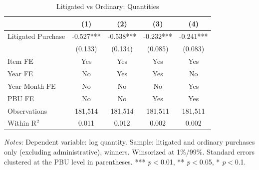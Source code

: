 \begin{table}[ht]
  \centering
  \caption{Litigated vs Ordinary: Quantities}
  \label{tab:t2_lit_quantities}
  \small
  \begin{threeparttable}
  \begin{tabular}{lcccc}
    \hline\hline
    & (1) & (2) & (3) & (4) \\
    \hline
    Litigated Purchase & -0.527*** & -0.538*** & -0.232*** & -0.241*** \\
     & (0.133) & (0.134) & (0.085) & (0.083) \\[3pt]
    \hline
    Item FE & Yes & Yes & Yes & Yes \\
    Year FE & No & Yes & Yes & No \\
    Year-Month FE & No & No & No & Yes \\
    PBU FE & No & No & Yes & Yes \\
    Observations & 181,514 & 181,514 & 181,511 & 181,511 \\
    Within R$^2$ & 0.011 & 0.012 & 0.002 & 0.002 \\
    \hline\hline
  \end{tabular}
  \begin{tablenotes}
    \small
    \item \textit{Notes:} Dependent variable: log quantity. Sample: litigated and ordinary purchases only (excluding administrative), winners. Winsorized at 1\%/99\%. Standard errors clustered at the PBU level in parentheses. *** \textit{p}$<$0.01, ** \textit{p}$<$0.05, * \textit{p}$<$0.1.
  \end{tablenotes}
  \end{threeparttable}
\end{table}
